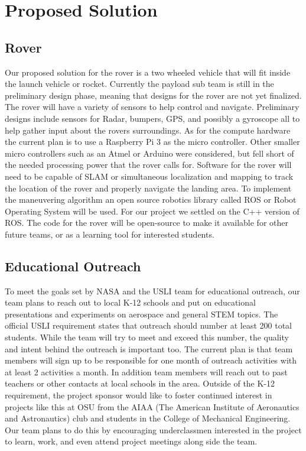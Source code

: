 \documentclass[onecolumn, draftclsnofoot,10pt, compsoc]{IEEEtran}
\begin{document}
\section{Proposed Solution}
\subsection{Rover}
Our proposed solution for the rover is a two wheeled vehicle that will fit inside the launch vehicle or rocket. Currently the payload sub team is still in the preliminary design phase, meaning that designs for the rover are not yet finalized. The rover will have a variety of sensors to help control and navigate. Preliminary designs include sensors for Radar, bumpers, GPS, and possibly a gyroscope all to help gather input about the rovers surroundings. As for the compute hardware the current plan is to use a Raspberry Pi 3 as the micro controller. Other smaller micro controllers such as an Atmel or Arduino were considered, but fell short of the needed processing power that the rover calls for. Software for the rover will need to be capable of SLAM or simultaneous localization and mapping to track the location of the rover and properly navigate the landing area. To implement the maneuvering algorithm an open source robotics library called ROS or Robot Operating System will be used. For our project we settled on the C++ version of ROS. The code for the rover will be open-source to make it available for other future teams, or as a learning tool for interested students.
\subsection{Educational Outreach}
To meet the goals set by NASA and the USLI team for educational outreach, our team plans to reach out to local K-12 schools and put on educational presentations and experiments on aerospace and general STEM topics. The official USLI requirement states that outreach should number at least 200 total students. While the team will try to meet and exceed this number, the quality and intent behind the outreach is important too. The current plan is that team members will sign up to be responsible for one month of outreach activities with at least 2 activities a month. In addition team members will reach out to past teachers or other contacts at local schools in the area. Outside of the K-12 requirement, the project sponsor would like to foster continued interest in projects like this at OSU from the AIAA (The American Institute of Aeronautics and Astronautics) club and students in the College of Mechanical Engineering. Our team plans to do this by encouraging underclassmen interested in the project to learn, work, and even attend project meetings along side the team. 
\end{document}
